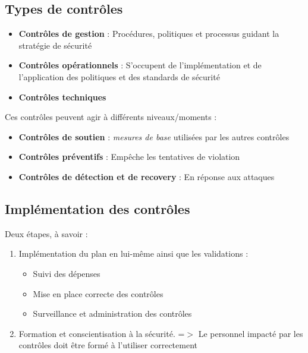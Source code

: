 \documentclass{report}
\begin{document}
\subsection{Types de contrôles}

\begin{itemize}
    \item \textbf{Contrôles de gestion} : Procédures, politiques et processus guidant la stratégie de sécurité

    \item \textbf{Contrôles opérationnels} : S'occupent de l'implémentation et de l'application des politiques et des standards de sécurité

    \item \textbf{Contrôles techniques}
\end{itemize}

Ces contrôles peuvent agir à différents niveaux/moments :
\begin{itemize}
    \item \textbf{Contrôles de soutien} : \textit{mesures de base} utilisées par les autres contrôles

    \item \textbf{Contrôles préventifs} : Empêche les tentatives de violation

    \item \textbf{Contrôles de détection et de recovery} : En réponse aux attaques
\end{itemize}

\subsection{Implémentation des contrôles}

Deux étapes, à savoir :

\begin{enumerate}
    \item Implémentation du plan en lui-même ainsi que les validations :
    \begin{itemize}
        \item Suivi des dépenses
        \item Mise en place correcte des contrôles
        \item Surveillance et administration des contrôles
    \end{itemize}

    \item Formation et conscientisation à la sécurité. =$>$ Le personnel impacté par les contrôles doit être formé à l'utiliser correctement
\end{enumerate}
\end{document}
